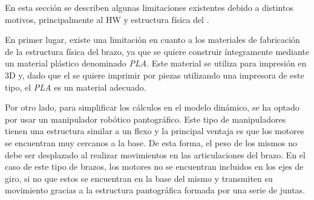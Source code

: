 En esta sección se describen  algunas limitaciones existentes debido a distintos motivos, principalmente al \ac{HW} y estructura física del \pArm{}.

En primer lugar, existe una limitación en cuanto a los materiales de fabricación de la estructura física del brazo, ya que se quiere construir íntegramente mediante un material plástico denominado \textit{PLA}. Este material se utiliza para impresión en 3D y, dado que el \pArm{} se quiere imprimir por piezas utilizando una impresora de este tipo, el \textit{PLA} es un material adecuado.

Por otro lado, para simplificar los cálculos en el modelo dinámico, se ha optado por usar un manipulador robótico pantográfico. Este tipo de manipuladores tienen una estructura similar a un flexo y la principal ventaja es que los motores se encuentran muy cercanos a la base. De esta forma, el peso de los mismos no debe ser desplazado al realizar movimientos en las articulaciones del brazo. En el caso de este tipo de brazos, los motores no se encuentran incluidos en los ejes de giro, si no que estos se encuentran en la base del mismo y transmiten su movimiento gracias a la estructura pantográfica formada por una serie de juntas.





